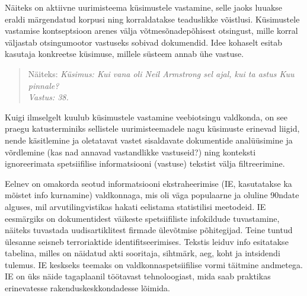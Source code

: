 \begin{multicols}{2}


Näiteks on aktiivne uurimisteema küsimustele vastamine, selle jaoks luuakse eraldi märgendatud korpusi ning korraldatakse teaduslikke võistlusi. 
Küsimustele vastamise kontseptsioon arenes välja võtmesõnadepõhisest otsingust, mille korral väljastab otsingumootor vastuseks sobivad dokumendid. 
Idee kohaselt esitab kasutaja konkreetse küsimuse, millele süsteem annab ühe vastuse.

\begin{quote}
Näiteks:
\textit{Küsimus: Kui vana oli Neil Armstrong sel ajal, kui ta astus Kuu pinnale?\\
Vastus: 38.}\\
\end{quote}

Kuigi ilmselgelt kuulub küsimustele vastamine veebiotsingu valdkonda, on see praegu katusterminiks sellistele uurimisteemadele nagu küsimuste erinevad liigid, nende käsitlemine ja oletatavat vastet sisaldavate dokumentide analüüsimine ja võrdlemine (kas nad annavad vastandlikke vastuseid?) ning konteksti ignoreerimata spetsiifilise informatsiooni (vastuse) tekstist välja filtreerimine. 

Eelnev on omakorda seotud informatsiooni ekstraheerimise (IE, kasutatakse ka mõistet info kurnamine) valdkonnaga, mis oli väga populaarne ja oluline 90ndate alguses, mil arvutilingvistikas hakati eelistama statistilisi meetodeid. 
IE eesmärgiks on dokumentidest väikeste spetsiifiliste infokildude tuvastamine, näiteks tuvastada uudisartiklitest firmade ülevõtmise põhitegijad. 
Teine tuntud ülesanne seisneb terroriaktide identifitseerimises. 
Tekstis leiduv info esitatakse tabelina, milles on näidatud akti sooritaja, sihtmärk, aeg, koht ja intsidendi tulemus. 
IE keskseks teemaks on valdkonnaspetsiifilise vormi täitmine andmetega. 
IE on üks näide tagaplaanil töötavast tehnoloogiast, mida saab praktikas erinevatesse rakenduskeskkondadesse lõimida. 


\end{multicols}
